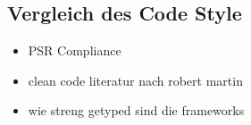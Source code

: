 \subsection{Vergleich des Code Style}
\begin{itemize}
    \item PSR Compliance
    \item clean code literatur nach robert martin
    \item wie streng getyped sind die frameworks
\end{itemize}
